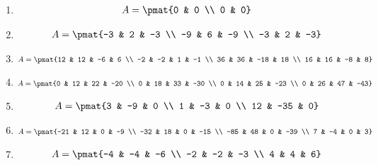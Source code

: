 \begin{enumerate}
\item

\begin{align*}
A = \pmat{0 & 0 \\ 0 & 0}
\end{align*}

\item

\begin{align*}
A = \pmat{-3 & 2 & -3 \\ -9 & 6 & -9 \\ -3 & 2 & -3}
\end{align*}

\item

\begin{align*}
A = \pmat{12 & 12 & -6 & 6 \\ -2 & -2 & 1 & -1 \\ 36 & 36 & -18 & 18 \\ 16 & 16 & -8 & 8}
\end{align*}

\item

\begin{align*}
A = \pmat{0 & 12 & 22 & -20 \\ 0 & 18 & 33 & -30 \\ 0 & 14 & 25 & -23 \\ 0 & 26 & 47 & -43}
\end{align*}

\item

\begin{align*}
A = \pmat{3 & -9 & 0 \\ 1 & -3 & 0 \\ 12 & -35 & 0}
\end{align*}

\item

\begin{align*}
A = \pmat{-21 & 12 & 0 & -9 \\ -32 & 18 & 0 & -15 \\ -85 & 48 & 0 & -39 \\ 7 & -4 & 0 & 3}
\end{align*}

\item

\begin{align*}
A = \pmat{-4 & -4 & -6 \\ -2 & -2 & -3 \\ 4 & 4 & 6}
\end{align*}


\end{enumerate}
